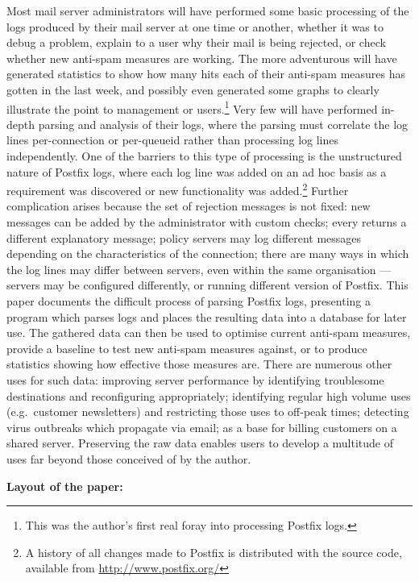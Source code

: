 \documentclass[a4paper,12pt,draft]{article}
\begin{document}
Most mail server administrators will have performed some basic processing
of the logs produced by their mail server at one time or another, whether
it was to debug a problem, explain to a user why their mail is being
rejected, or check whether new anti-spam measures are working.  The more
adventurous will have generated statistics to show how many hits each of
their anti-spam measures has gotten in the last week, and possibly even
generated some graphs to clearly illustrate the point to management or
users.\footnote{This was the author's first real foray into processing
Postfix logs.}  Very few will have performed in-depth parsing and analysis
of their logs, where the parsing must correlate the log lines
per-connection or per-queueid rather than processing log lines
independently.  One of the barriers to this type of processing is the
unstructured nature of Postfix logs, where each log line was added on an ad
hoc basis as a requirement was discovered or new functionality was
added.\footnote{A history of all changes made to Postfix is distributed
with the source code, available from \url{http://www.postfix.org/}} Further
complication arises because the set of rejection messages is not fixed: new
messages can be added by the administrator with custom checks; every \RBL{}
returns a different explanatory message; policy servers may log different
messages depending on the characteristics of the connection; there are many
ways in which the log lines may differ between servers, even within the
same organisation --- servers may be configured differently, or running
different version of Postfix.  This paper documents the difficult process
of parsing Postfix logs, presenting a program which parses logs and places
the resulting data into a database for later use.  The gathered data can
then be used to optimise current anti-spam measures, provide a baseline to
test new anti-spam measures against, or to produce statistics showing how
effective those measures are.  There are numerous other uses for such data:
improving server performance by identifying troublesome destinations and
reconfiguring appropriately; identifying regular high volume uses (e.g.\
customer newsletters) and restricting those uses to off-peak times;
detecting virus outbreaks which propagate via email; as a base for billing
customers on a shared server.  Preserving the raw data enables users to
develop a multitude of uses far beyond those conceived of by the author.

\vspace{1em}\noindent\textbf{Layout of the paper:}
\end{document}
